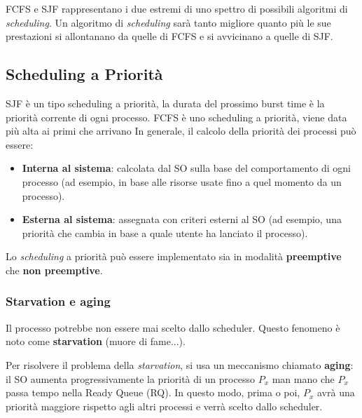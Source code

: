 FCFS e SJF rappresentano i due estremi di uno spettro di possibili algoritmi di \textit{scheduling}. Un algoritmo di \textit{scheduling} sarà tanto migliore quanto più le sue prestazioni si allontanano da quelle di FCFS e si avvicinano a quelle di SJF.

\subsection{Scheduling a Priorità}
SJF è un tipo scheduling a priorità, la durata del prossimo burst time è la priorità corrente di ogni processo.
FCFS è uno scheduling a priorità, viene data più alta ai primi che arrivano
In generale, il calcolo della priorità dei processi può essere:
\begin{itemize}
    \item \textbf{Interna al sistema}: calcolata dal SO sulla base del comportamento di ogni processo (ad esempio, in base alle risorse usate fino a quel momento da un processo).
    \item \textbf{Esterna al sistema}: assegnata con criteri esterni al SO (ad esempio, una priorità che cambia in base a quale utente ha lanciato il processo).
\end{itemize}

Lo \textit{scheduling} a priorità può essere implementato sia in modalità \textbf{preemptive} che \textbf{non preemptive}.

\subsubsection{Starvation e aging}
Il processo potrebbe non essere mai scelto dallo scheduler. Questo fenomeno è noto come \textbf{starvation} (muore di fame...). 

Per risolvere il problema della \textit{starvation}, si usa un meccanismo chiamato \textbf{aging}: il SO aumenta progressivamente la priorità di un processo $P_x$ man mano che $P_x$ passa tempo nella Ready Queue (RQ). In questo modo, prima o poi, $P_x$ avrà una priorità maggiore rispetto agli altri processi e verrà scelto dallo scheduler.


